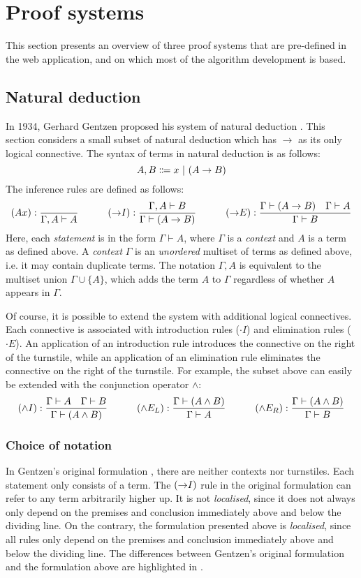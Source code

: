 \section{Proof systems}
\label{background:proof-systems}
This section presents an overview of three proof systems that are pre-defined in the web application, and on which most of the algorithm development is based.

\subsection{Natural deduction}
In 1934, Gerhard Gentzen proposed his system of natural deduction \cite{gentzen:1969}. This section considers a small subset of natural deduction which has $\to$ as its only logical connective. The syntax of terms in natural deduction is as follows:
\[
    A, B \Coloneqq x \ |\  (A \to B)
\]
The inference rules are defined as follows:
{
    \derivationfont
    \[
        (Ax): \frac{}{\Gamma, A \vdash A} \quad\quad\quad (\mathord{\to} I): \frac{\Gamma, A \vdash B}{\Gamma \vdash (A \to B)} \quad\quad\quad (\mathord{\to} E): \frac{\Gamma \vdash (A \to B) \quad \Gamma \vdash A}{\Gamma \vdash B}
    \]
}%
Here, each \textit{statement} is in the form $\Gamma \vdash A$, where $\Gamma$ is a \textit{context} and $A$ is a term as defined above. A \textit{context} $\Gamma$ is an \textit{unordered} multiset of terms as defined above, i.e. it may contain duplicate terms. The notation $\Gamma, A$ is equivalent to the multiset union $\Gamma \cup \{ A \}$, which adds the term $A$ to $\Gamma$ regardless of whether $A$ appears in $\Gamma$.

Of course, it is possible to extend the system with additional logical connectives. Each connective is associated with introduction rules ($\cdot I$) and elimination rules ($\cdot E$). An application of an introduction rule introduces the connective on the right of the turnstile, while an application of an elimination rule eliminates the connective on the right of the turnstile. For example, the subset above can easily be extended with the conjunction operator $\land$:
{
    \derivationfont
    \[
        (\land I): \frac{\Gamma \vdash A \quad \Gamma \vdash B}{\Gamma \vdash (A \land B)} \quad\quad\quad (\land E_L): \frac{\Gamma \vdash (A \land B)}{\Gamma \vdash A} \quad\quad\quad (\land E_R): \frac{\Gamma \vdash (A \land B)}{\Gamma \vdash B}
    \]
}%

\subsubsection{Choice of notation}
In Gentzen's original formulation \cite{gentzen:1969}, there are neither contexts nor turnstiles. Each statement only consists of a term. The $(\mathord{\to} I)$ rule in the original formulation can refer to any term arbitrarily higher up. It is not \textit{localised}, since it does not always only depend on the premises and conclusion immediately above and below the dividing line. On the contrary, the formulation presented above is \textit{localised}, since all rules only depend on the premises and conclusion immediately above and below the dividing line. The differences between Gentzen's original formulation and the formulation above are highlighted in .

